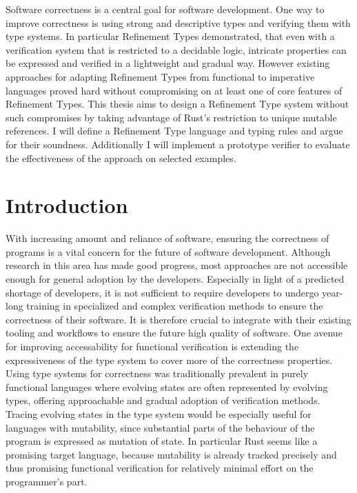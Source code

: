\documentclass{book}
\theoremstyle{definition}
\begin{document}
\tableofcontents


Software correctness is a central goal for software development.
One way to improve correctness is using strong and descriptive types and verifying them with type systems.
In particular Refinement Types demonstrated, that even with a verification system that is restricted to a decidable logic, intricate properties can be expressed and verified in a lightweight and gradual way.
However existing approaches for adapting Refinement Types from functional to imperative languages proved hard without compromising on at least one of core features of Refinement Types.
This thesis aims to design a Refinement Type system without such compromises by taking advantage of Rust's restriction to unique mutable references.
I will define a Refinement Type language and typing rules and argue for their soundness. Additionally I will implement a prototype verifier to evaluate the effectiveness of the approach on selected examples.





\chapter{Introduction}

With increasing amount and reliance of software, ensuring the correctness of programs is a vital concern for the future of software development.
Although research in this area has made good progress, most approaches are not accessible enough for general adoption by the developers. Especially in light of a predicted shortage of developers\cite{breaux_2021_2021-1}, it is not sufficient to require developers to undergo year-long training in specialized and complex verification methods to ensure the correctness of their software. It is therefore crucial to integrate with their existing tooling and workflows to ensure the future high quality of software.
One avenue for improving accessability for functional verification is extending the expressiveness of the type system to cover more of the correctness properties.
Using type systems for correctness was traditionally prevalent in purely functional languages where evolving states are often represented by evolving types, offering approachable and gradual adoption of verification methods. Tracing evolving states in the type system would be especially useful for languages with mutability, since substantial parts of the behaviour of the program is expressed as mutation of state. In particular Rust seems like a promising target language, because mutability is already tracked precisely and thus promising functional verification for relatively minimal effort on the programmer's part.
\end{document}
